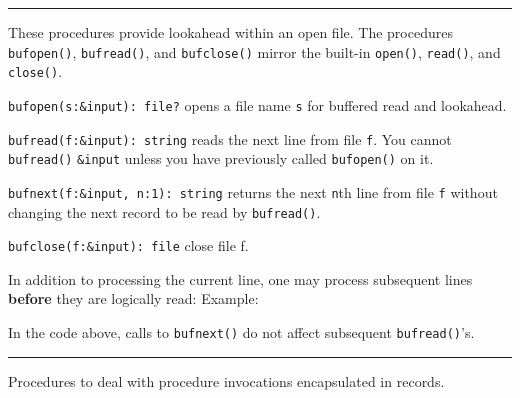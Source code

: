 
\vspace{0.25cm}\hrule{}

These procedures provide lookahead within an open file. The procedures
\texttt{bufopen()}, \texttt{bufread()}, and \texttt{bufclose()} mirror
the built-in \texttt{open()}, \texttt{read()}, and \texttt{close()}.

\texttt{bufopen(s:\&input): file?} opens a file name \texttt{s} for
buffered read and lookahead.

\texttt{bufread(f:\&input): string} reads the next line from file
\texttt{f}. You cannot \texttt{bufread()} \texttt{\&input} unless you
have previously called \texttt{bufopen()} on it.

\texttt{bufnext(f:\&input, n:1): string} returns the next \texttt{n}th
line from file \texttt{f} without changing the next record to be read
by \texttt{bufread()}.

\texttt{bufclose(f:\&input): file} close file f.

In addition to processing the current line, one may process subsequent
lines \textbf{before} they are logically read: Example:


In the code above, calls to \texttt{bufnext()} do not affect subsequent
\texttt{bufread()}'s.

\vspace{0.25cm}\hrule{}

Procedures to deal with procedure
invocations encapsulated in records.

